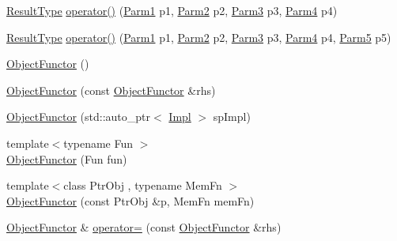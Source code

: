\begin{DoxyCompactItemize}
\item 
\mbox{\hyperlink{classUtil_1_1ObjectFunctor_a77f816e98108848347d0dfc085090a1c}{Result\+Type}} \mbox{\hyperlink{classUtil_1_1ObjectFunctor_a87c6264782e6c535c3a66f385d922f12}{operator()}} (\mbox{\hyperlink{classUtil_1_1ObjectFunctor_a199715d28029627c2ae7219c13b04d26}{Parm1}} p1, \mbox{\hyperlink{classUtil_1_1ObjectFunctor_a6809cf65883dc7575e01d9b9849649cf}{Parm2}} p2, \mbox{\hyperlink{classUtil_1_1ObjectFunctor_a6becd26610c6091b9ba93cd96f3def66}{Parm3}} p3, \mbox{\hyperlink{classUtil_1_1ObjectFunctor_a54ce0b64981cd7f558ce8eea7df3f1b2}{Parm4}} p4)
\item 
\mbox{\hyperlink{classUtil_1_1ObjectFunctor_a77f816e98108848347d0dfc085090a1c}{Result\+Type}} \mbox{\hyperlink{classUtil_1_1ObjectFunctor_a95b7e08a92f54e2ce8a90153c1414abd}{operator()}} (\mbox{\hyperlink{classUtil_1_1ObjectFunctor_a199715d28029627c2ae7219c13b04d26}{Parm1}} p1, \mbox{\hyperlink{classUtil_1_1ObjectFunctor_a6809cf65883dc7575e01d9b9849649cf}{Parm2}} p2, \mbox{\hyperlink{classUtil_1_1ObjectFunctor_a6becd26610c6091b9ba93cd96f3def66}{Parm3}} p3, \mbox{\hyperlink{classUtil_1_1ObjectFunctor_a54ce0b64981cd7f558ce8eea7df3f1b2}{Parm4}} p4, \mbox{\hyperlink{classUtil_1_1ObjectFunctor_a8428e04dd3fb91bc7f7c518a1771eecb}{Parm5}} p5)
\item 
\mbox{\hyperlink{classUtil_1_1ObjectFunctor_ac08a0820c0cf21a61abb6da3ede541d4}{Object\+Functor}} ()
\item 
\mbox{\hyperlink{classUtil_1_1ObjectFunctor_a2d42842ec3d69b317aaaafd65cd9e2fd}{Object\+Functor}} (const \mbox{\hyperlink{classUtil_1_1ObjectFunctor}{Object\+Functor}} \&rhs)
\item 
\mbox{\hyperlink{classUtil_1_1ObjectFunctor_a60702c933bbfec0d0a0e4459debe21b7}{Object\+Functor}} (std\+::auto\+\_\+ptr$<$ \mbox{\hyperlink{classUtil_1_1ObjectFunctor_a93fc635194d1d2768e73ba87d03abd8d}{Impl}} $>$ sp\+Impl)
\item 
{\footnotesize template$<$typename Fun $>$ }\\\mbox{\hyperlink{classUtil_1_1ObjectFunctor_a8a0c7fe30526a774ce94c7a24af4108d}{Object\+Functor}} (Fun fun)
\item 
{\footnotesize template$<$class Ptr\+Obj , typename Mem\+Fn $>$ }\\\mbox{\hyperlink{classUtil_1_1ObjectFunctor_a346fdbed7070eeafec9270c9a5a766ec}{Object\+Functor}} (const Ptr\+Obj \&p, Mem\+Fn mem\+Fn)
\item 
\mbox{\hyperlink{classUtil_1_1ObjectFunctor}{Object\+Functor}} \& \mbox{\hyperlink{classUtil_1_1ObjectFunctor_a90395c8be24965e154bee2f7813a78e8}{operator=}} (const \mbox{\hyperlink{classUtil_1_1ObjectFunctor}{Object\+Functor}} \&rhs)

\end{DoxyCompactItemize}
